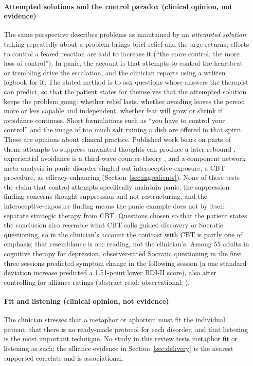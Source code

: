 \paragraph{Attempted solutions and the control paradox (clinical opinion, not evidence)} The same perspective describes problems as maintained by an \emph{attempted solution}: talking repeatedly about a problem brings brief relief and the urge returns; efforts to control a feared reaction are said to increase it (``the more control, the more loss of control'').
In panic, the account is that attempts to control the heartbeat or trembling drive the escalation, and the clinician reports using a written logbook for it.
The stated method is to ask questions whose answers the therapist can predict, so that the patient states for themselves that the attempted solution keeps the problem going: whether relief lasts, whether avoiding leaves the person more or less capable and independent, whether fear will grow or shrink if avoidance continues.
Short formulations such as ``you have to control your control'' and the image of too much salt ruining a dish are offered in that spirit.
These are opinions about clinical practice.
Published work bears on parts of them: attempts to suppress unwanted thoughts can produce a later rebound \citep{wenzlaff2000suppression,abramowitz2001suppression}, experiential avoidance is a third-wave counter-theory \citep{hayes1996avoidance}, and a component network meta-analysis in panic disorder singled out interoceptive exposure, a CBT procedure, as efficacy-enhancing (Section~\ref{sec:ingredients}).
None of these tests the claim that control attempts specifically maintain panic, the suppression finding concerns thought suppression and not restructuring, and the interoceptive-exposure finding means the panic example does not by itself separate strategic therapy from CBT.
Questions chosen so that the patient states the conclusion also resemble what CBT calls guided discovery or Socratic questioning, so in the clinician's account the contrast with CBT is partly one of emphasis; that resemblance is our reading, not the clinician's.
Among 55 adults in cognitive therapy for depression, observer-rated Socratic questioning in the first three sessions predicted symptom change in the following session (a one standard deviation increase predicted a 1.51-point lower BDI-II score), also after controlling for alliance ratings (abstract read; observational; \citealp{braun2015socratic}).

\paragraph{Fit and listening (clinical opinion, not evidence)} The clinician stresses that a metaphor or aphorism must fit the individual patient, that there is no ready-made protocol for each disorder, and that listening is the most important technique.
No study in this review tests metaphor fit or listening as such; the alliance evidence in Section~\ref{sec:delivery} is the nearest supported correlate and is associational.

